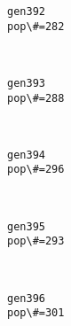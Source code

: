 \documentclass[11pt]{article}
\begin{document}
    \begin{Verbatim}[commandchars=\\\{\}]
gen392
pop\#=282

    \end{Verbatim}

    \begin{center}
    \end{center}
    { \hspace*{\fill} \\}
    
    \begin{Verbatim}[commandchars=\\\{\}]
gen393
pop\#=288

    \end{Verbatim}

    \begin{center}
    \end{center}
    { \hspace*{\fill} \\}
    
    \begin{Verbatim}[commandchars=\\\{\}]
gen394
pop\#=296

    \end{Verbatim}

    \begin{center}
    \end{center}
    { \hspace*{\fill} \\}
    
    \begin{Verbatim}[commandchars=\\\{\}]
gen395
pop\#=293

    \end{Verbatim}

    \begin{center}
    \end{center}
    { \hspace*{\fill} \\}
    
    \begin{Verbatim}[commandchars=\\\{\}]
gen396
pop\#=301

    \end{Verbatim}
\end{document}
